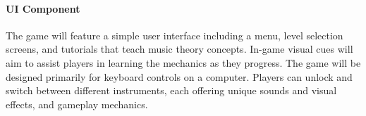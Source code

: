 \documentclass[11pt]{article}
\begin{document}
\paragraph*{UI Component}
The game will feature a simple user interface including a menu, level selection screens, and 
tutorials that teach music theory concepts. In-game visual cues will aim to assist players in 
learning the mechanics as they progress. The game will be designed primarily for keyboard 
controls on a computer. Players can unlock and switch between different instruments, each 
offering unique sounds and visual effects, and gameplay mechanics. 
\end{document}
